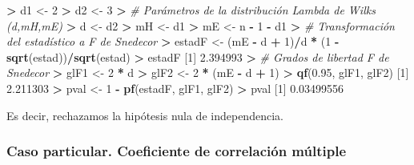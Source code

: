 \documentclass[
  a4paper,
  oneside]{scrbook}
\newenvironment{Shaded}{\begin{snugshade}}{\end{snugshade}}
\newcommand{\CommentTok}[1]{\textcolor[rgb]{0.56,0.35,0.01}{\textit{#1}}}
\newcommand{\DecValTok}[1]{\textcolor[rgb]{0.00,0.00,0.81}{#1}}
\newcommand{\ErrorTok}[1]{\textcolor[rgb]{0.64,0.00,0.00}{\textbf{#1}}}
\newcommand{\FloatTok}[1]{\textcolor[rgb]{0.00,0.00,0.81}{#1}}
\newcommand{\FunctionTok}[1]{\textcolor[rgb]{0.13,0.29,0.53}{\textbf{#1}}}
\newcommand{\NormalTok}[1]{#1}
\newcommand{\OtherTok}[1]{\textcolor[rgb]{0.56,0.35,0.01}{#1}}
\newcommand{\SpecialCharTok}[1]{\textcolor[rgb]{0.81,0.36,0.00}{\textbf{#1}}}
\theoremstyle{definition}
\theoremstyle{definition}
\theoremstyle{definition}
\theoremstyle{definition}
\theoremstyle{remark}
\begin{document}
\begin{Shaded}
\begin{Highlighting}[]
\SpecialCharTok{\textgreater{}}\NormalTok{ d1 }\OtherTok{\textless{}{-}} \DecValTok{2}
\SpecialCharTok{\textgreater{}}\NormalTok{ d2 }\OtherTok{\textless{}{-}} \DecValTok{3}
\SpecialCharTok{\textgreater{}} \CommentTok{\# Parámetros de la distribución Lambda de Wilks (d,mH,mE)}
\ErrorTok{\textgreater{}}\NormalTok{ d }\OtherTok{\textless{}{-}}\NormalTok{ d2}
\SpecialCharTok{\textgreater{}}\NormalTok{ mH }\OtherTok{\textless{}{-}}\NormalTok{ d1}
\SpecialCharTok{\textgreater{}}\NormalTok{ mE }\OtherTok{\textless{}{-}}\NormalTok{ n }\SpecialCharTok{{-}} \DecValTok{1} \SpecialCharTok{{-}}\NormalTok{ d1}
\SpecialCharTok{\textgreater{}} \CommentTok{\# Transformación del estadístico a F de Snedecor}
\ErrorTok{\textgreater{}}\NormalTok{ estadF }\OtherTok{\textless{}{-}}\NormalTok{ (mE }\SpecialCharTok{{-}}\NormalTok{ d }\SpecialCharTok{+} \DecValTok{1}\NormalTok{)}\SpecialCharTok{/}\NormalTok{d }\SpecialCharTok{*}\NormalTok{ (}\DecValTok{1} \SpecialCharTok{{-}} \FunctionTok{sqrt}\NormalTok{(estad))}\SpecialCharTok{/}\FunctionTok{sqrt}\NormalTok{(estad)}
\SpecialCharTok{\textgreater{}}\NormalTok{ estadF}
\NormalTok{[}\DecValTok{1}\NormalTok{] }\FloatTok{2.394993}
\SpecialCharTok{\textgreater{}} \CommentTok{\# Grados de libertad F de Snedecor}
\ErrorTok{\textgreater{}}\NormalTok{ glF1 }\OtherTok{\textless{}{-}} \DecValTok{2} \SpecialCharTok{*}\NormalTok{ d}
\SpecialCharTok{\textgreater{}}\NormalTok{ glF2 }\OtherTok{\textless{}{-}} \DecValTok{2} \SpecialCharTok{*}\NormalTok{ (mE }\SpecialCharTok{{-}}\NormalTok{ d }\SpecialCharTok{+} \DecValTok{1}\NormalTok{)}
\SpecialCharTok{\textgreater{}} \FunctionTok{qf}\NormalTok{(}\FloatTok{0.95}\NormalTok{, glF1, glF2)}
\NormalTok{[}\DecValTok{1}\NormalTok{] }\FloatTok{2.211303}
\SpecialCharTok{\textgreater{}}\NormalTok{ pval }\OtherTok{\textless{}{-}} \DecValTok{1} \SpecialCharTok{{-}} \FunctionTok{pf}\NormalTok{(estadF, glF1, glF2)}
\SpecialCharTok{\textgreater{}}\NormalTok{ pval}
\NormalTok{[}\DecValTok{1}\NormalTok{] }\FloatTok{0.03499556}
\end{Highlighting}
\end{Shaded}

\normalsize

Es decir, rechazamos la hipótesis nula de independencia.

\subsubsection{Caso particular. Coeficiente de correlación múltiple}\label{caso-particular-coeficiente-de-correlacion-multiple}
\end{document}
